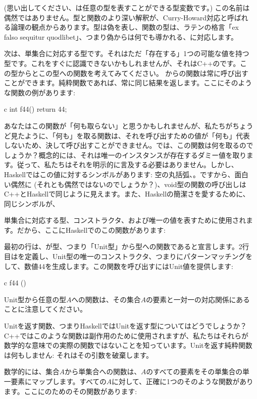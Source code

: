  (思い出してください、は任意の型を表すことができる型変数です。) この名前は偶然ではありません。型と関数のより深い解釈が、Curry-Howard対応と呼ばれる論理の観点からあります。型は偽を表し、関数の型は、ラテンの格言「ex falso sequitur quodlibet」、つまり偽からは何でも導かれる、に対応します。

次は、単集合に対応する型です。それはただ「存在する」1つの可能な値を持つ型です。これをすぐに認識できないかもしれませんが、それはC++のです。この型からとこの型への関数を考えてみてください。 からの関数は常に呼び出すことができます。純粋関数であれば、常に同じ結果を返します。ここにそのような関数の例があります: 

\begin{snip}{c}
int f44() { return 44; }
\end{snip}
あなたはこの関数が「何も取らない」と思うかもしれませんが、私たちがちょうど見たように、「何も」を取る関数は、それを呼び出すための値が「何も」代表しないため、決して呼び出すことができません。では、この関数は何を取るのでしょうか？概念的には、それは唯一のインスタンスが存在するダミー値を取ります。従って、私たちはそれを明示的に言及する必要はありません。しかし、Haskellではこの値に対するシンボルがあります: 空の丸括弧、\code{()}。ですから、面白い偶然に (それとも偶然ではないのでしょうか？)、void型の関数の呼び出しはC++とHaskellで同じように見えます。また、Haskellの簡潔さを愛するために、同じシンボル\code{()}が、

単集合に対応する型、コンストラクタ、および唯一の値を表すために使用されます。だから、ここにHaskellでのこの関数があります: 

最初の行は、が型\code{()}、つまり「Unit型」から型への関数であると宣言します。2行目はを定義し、Unit型の唯一のコンストラクタ、つまり\code{()}にパターンマッチングをして、数値44を生成します。この関数を呼び出すにはUnit値\code{()}を提供します: 

\begin{snip}{c}
f44 ()
\end{snip}
Unit型から任意の型$A$への関数は、その集合$A$の要素と一対一の対応関係にあることに注意してください。

Unitを返す関数、つまりHaskellではUnitを返す型についてはどうでしょうか？C++ではこのような関数は副作用のために使用されますが、私たちはそれらが数学的な意味での実際の関数ではないことを知っています。Unitを返す純粋関数は何もしません: それはその引数を破棄します。

数学的には、集合$A$から単集合への関数は、$A$のすべての要素をその単集合の単一要素にマップします。すべての$A$に対して、正確に1つのそのような関数があります。ここにのためのその関数があります: 

